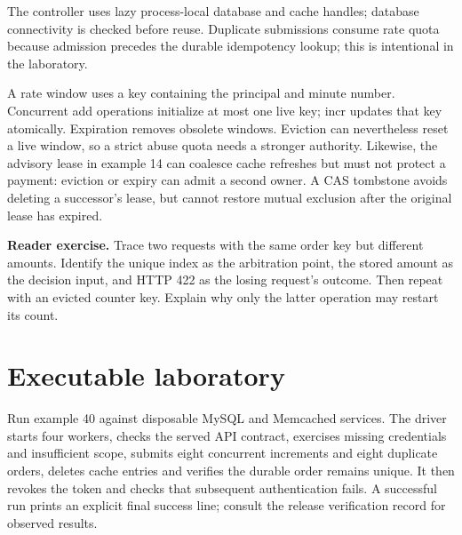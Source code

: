 The controller uses lazy process-local database and cache handles; database connectivity is checked before reuse. Duplicate submissions consume rate quota because admission precedes the durable idempotency lookup; this is intentional in the laboratory.

A rate window uses a key containing the principal and minute number. Concurrent add operations initialize at most one live key; incr updates that key atomically. Expiration removes obsolete windows. Eviction can nevertheless reset a live window, so a strict abuse quota needs a stronger authority. Likewise, the advisory lease in example 14 can coalesce cache refreshes but must not protect a payment: eviction or expiry can admit a second owner. A CAS tombstone avoids deleting a successor's lease, but cannot restore mutual exclusion after the original lease has expired.

\noindent\textbf{Reader exercise.} Trace two requests with the same order key but different amounts. Identify the unique index as the arbitration point, the stored amount as the decision input, and HTTP 422 as the losing request's outcome. Then repeat with an evicted counter key. Explain why only the latter operation may restart its count.

\section{Executable laboratory}
Run example 40 against disposable MySQL and Memcached services. The driver starts four workers, checks the served API contract, exercises missing credentials and insufficient scope, submits eight concurrent increments and eight duplicate orders, deletes cache entries and verifies the durable order remains unique. It then revokes the token and checks that subsequent authentication fails. A successful run prints an explicit final success line; consult the release verification record for observed results.

